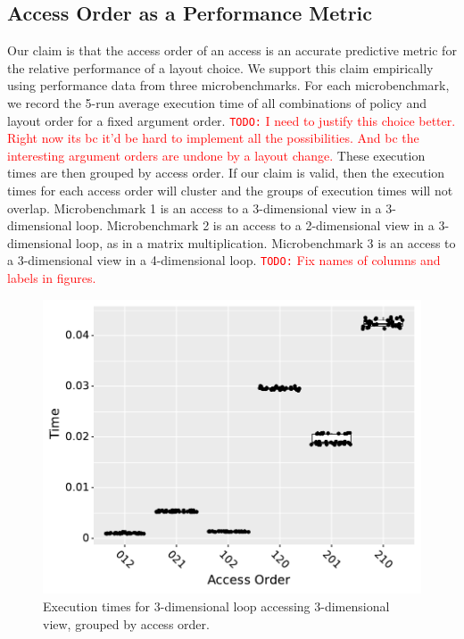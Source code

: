 \documentclass[sigconf, table]{acmart}
\newcommand{\todo}[1]{{\textcolor{red}{{\tt{TODO:}}\,\,#1 }}}
\begin{document}
\subsection{Access Order as a Performance Metric}
Our claim is that the access order of an access is an accurate predictive metric for the relative performance of a layout choice. 
We support this claim empirically using performance data from three microbenchmarks.
For each microbenchmark, we record the 5-run average execution time of all combinations of policy and layout order for a fixed argument order. 
\todo{I need to justify this choice better. Right now its bc it'd be hard to implement all the possibilities. And bc the interesting argument orders are undone by a layout change.}
These execution times are then grouped by access order.
If our claim is valid, then the execution times for each access order will cluster and the groups of execution times will not overlap.
Microbenchmark 1 is an access to a 3-dimensional view in a 3-dimensional loop. 
Microbenchmark 2 is an access to a 2-dimensional view in a 3-dimensional loop, as in a matrix multiplication.
Microbenchmark 3 is an access to a 3-dimensional view in a 4-dimensional loop.
\todo{Fix names of columns and labels in figures.}
\begin{figure}
	\includegraphics[width=\columnwidth]{benchmark1_boxplot.pdf}
	\caption{Execution times for 3-dimensional loop accessing 3-dimensional view, grouped by access order.}
	\label{AccessBenchmark1}
\end{figure}
\end{document}
